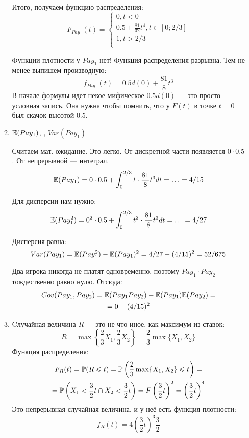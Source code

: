 \begin{enumerate}
\begin{enumerate}
Итого, получаем функцию распределения:
\begin{equation}
F_{Pay_{1}}(t)=
\begin{cases}
0, t<0 \\
0.5+\frac{81}{32}t^{4}, t\in [0;2/3] \\
1, t>2/3 \\
\end{cases}
\end{equation}

Функции плотности у $ Pay_{1} $ нет! Функция распределения разрывна. Тем не менее выпишем производную:
\begin{equation}
f_{Pay_{1}}(t)=0.5d(0)+\frac{81}{8}t^{3}
\end{equation}
В начале формулы идет некое мифическое $ 0.5d(0) $ — это просто условная запись. Она нужна чтобы помнить, что у  $ F(t) $ в точке $ t=0 $ был скачок высотой $ 0.5 $.


\item $ \E(Pay_{1}) $, , $ Var(Pay_{1}) $

Считаем мат. ожидание. Это легко. От дискретной части появляется $ 0\cdot 0.5 $. От непрерывной — интеграл.
\begin{equation}
\E(Pay_{1})=0\cdot 0.5+\int_{0}^{2/3}t\cdot \frac{81}{8}t^{3} dt=\ldots=4/15
\end{equation}

Для дисперсии нам нужно:
\begin{equation}
\E(Pay_{1}^{2})=0^{2}\cdot 0.5+\int_{0}^{2/3}t^{2}\cdot \frac{81}{8}t^{3} dt=\ldots=4/27
\end{equation}

Дисперсия равна:
\begin{equation}
Var(Pay_{1})=\E(Pay_{1}^{2})-\E(Pay_{1})^{2}=4/27-(4/15)^{2}=52/675
\end{equation}


Два игрока никогда не платят одновременно, поэтому $ Pay_{1}\cdot Pay_{2} $ тождественно равно нулю. Отсюда:
\begin{multline}
Cov(Pay_{1},Pay_{2})=\E(Pay_{1}Pay_{2})-\E(Pay_{1})\E(Pay_{2})=\\
=0-(4/15)^{2}
\end{multline}
\item Cлучайная величина $ R$ — это не что иное, как максимум из ставок:
\begin{equation}
R=\max\left\{ \frac{2}{3}X_{1},\frac{2}{3}X_{2} \right\}=\frac{2}{3}\max\{X_{1},X_{2}\}
\end{equation}
Функция распределения:
\begin{multline}
F_{R}(t)=\P(R\leq t)=\P\left(\frac{2}{3}\max\{X_{1},X_{2}\}\leq t\right)=\\
=\P\left(X_{1}<\frac{3}{2}t \cap X_{2}<\frac{3}{2}t\right)=F\left(\frac{3}{2}t\right)^{2}=\left(\frac{3}{2}t\right)^{4}
\end{multline}
Это непрерывная случайная величина, и у неё есть функция плотности:
\begin{equation}
f_{R}(t)=4\left(\frac{3}{2}t\right)^{3}\frac{3}{2}
\end{equation}


\end{enumerate}
\end{enumerate}
